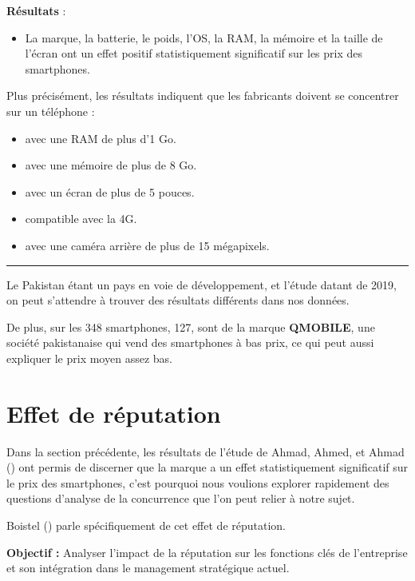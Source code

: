 \documentclass[
  12pt,
]{report}
\providecommand{\tightlist}{%
  \setlength{\itemsep}{0pt}\setlength{\parskip}{0pt}}\usepackage{longtable,booktabs,array}
\begin{document}
\textbf{Résultats} :

\begin{itemize}
\tightlist
\item
  La marque, la batterie, le poids, l'OS, la RAM, la mémoire et la
  taille de l'écran ont un effet positif statistiquement significatif
  sur les prix des smartphones.
\end{itemize}

Plus précisément, les résultats indiquent que les fabricants doivent se
concentrer sur un téléphone :

\begin{itemize}
\tightlist
\item
  avec une RAM de plus d'1 Go.
\item
  avec une mémoire de plus de 8 Go.
\item
  avec un écran de plus de 5 pouces.
\item
  compatible avec la 4G.
\item
  avec une caméra arrière de plus de 15 mégapixels.
\end{itemize}

\begin{center}\rule{0.5\linewidth}{0.5pt}\end{center}

Le Pakistan étant un pays en voie de développement, et l'étude datant de
2019, on peut s'attendre à trouver des résultats différents dans nos
données.

De plus, sur les 348 smartphones, 127, sont de la marque
\textbf{QMOBILE}, une société pakistanaise qui vend des smartphones à
bas prix, ce qui peut aussi expliquer le prix moyen assez bas.

\section{Effet de réputation}\label{effet-de-ruxe9putation}

Dans la section précédente, les résultats de l'étude de Ahmad, Ahmed, et
Ahmad () ont permis de discerner que la
marque a un effet statistiquement significatif sur le prix des
smartphones, c'est pourquoi nous voulions explorer rapidement des
questions d'analyse de la concurrence que l'on peut relier à notre
sujet.

Boistel () parle spécifiquement de cet
effet de réputation.

\textbf{Objectif :} Analyser l'impact de la réputation sur les fonctions
clés de l'entreprise et son intégration dans le management stratégique
actuel.
\end{document}
